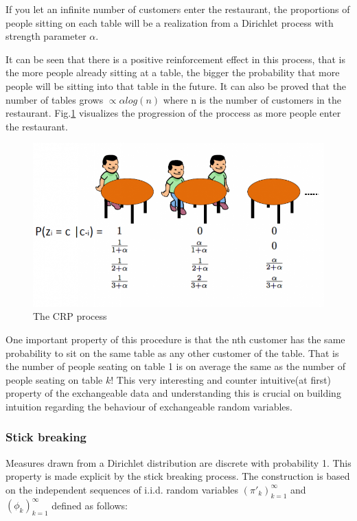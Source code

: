 \documentclass[twoside,hidelinks]{article}
\begin{document}
If you let an infinite number of customers enter the restaurant, the proportions of people sitting on each table will be a realization from a Dirichlet process with strength parameter $\alpha$.

It can be seen that there is a positive reinforcement effect in this process, that is the more people already sitting at a table, the bigger the probability that more people will be sitting into that table in the future. It can also be proved that the number of tables grows $ \propto \alpha log(n)$ where n is the number of customers in the restaurant. Fig.\ref{CRP} visualizes the progression of the proccess as more people enter the restaurant. 

\begin{figure}[!h]
          \centerline{\includegraphics[width=.70\textwidth]{crp}}
	\caption{The CRP process}
	\label{CRP}
\end{figure}


One important property of this procedure is that the nth customer has the same probability to sit on the same table as any other customer of the table. That is the number of people seating on table 1 is on average the same as the number of people seating on table $k$! This very interesting and counter intuitive(at first) property of the exchangeable data and understanding this is crucial on building intuition regarding the behaviour of exchangeable random variables.


\subsubsection{Stick breaking}

Measures drawn from a Dirichlet distribution are discrete with probability 1. This property is made explicit by the stick breaking process. The construction is based on the independent sequences of i.i.d. random variables $(\pi'_k)_{k=1}^\infty$ and $ ( \phi_k)_{k=1}^\infty$  defined as follows:

\ \ 
\end{document}
